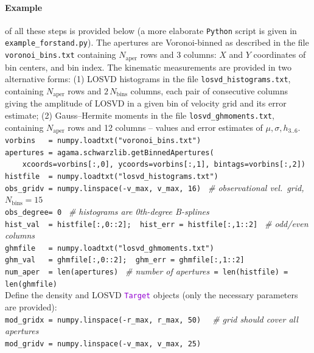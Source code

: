 \documentclass[12pt]{article}
\newcommand{\Python}{\texttt{Python}\xspace}
\newcommand{\ttt}[1]{\textcolor{darkviolet}{\texttt{#1}}}
\let\oldparagraph\paragraph
\renewcommand{\paragraph}[1]{\vspace{-2mm}\oldparagraph{#1}}
\begin{document}
\paragraph{Example} \label{sec:SchwarzschildExample} of all these steps is provided below (a more elaborate \Python script is given in \texttt{example_forstand.py}). The apertures are Voronoi-binned as described in the file \texttt{voronoi_bins.txt} containing $N_\mathrm{aper}$ rows and 3 columns: $X$ and $Y$ coordinates of bin centers, and bin index. The kinematic measurements are provided in two alternative forms: (1) LOSVD histograms in the file \texttt{losvd_histograms.txt}, containing $N_\mathrm{aper}$ rows and $2\,N_\mathrm{bins}$ columns, each pair of consecutive columns giving the amplitude of LOSVD in a given bin of velocity grid and its error estimate; (2) Gauss--Hermite moments in the file \texttt{losvd_ghmoments.txt}, containing $N_\mathrm{aper}$ rows and 12 columns -- values and error estimates of $\mu, \sigma, h_{3..6}$.\\[2mm]
\texttt{vorbins~~~= numpy.loadtxt("voronoi_bins.txt")\\
apertures~= agama.schwarzlib.getBinnedApertures(\\
\mbox{}~~~~xcoords=vorbins[:,0], ycoords=vorbins[:,1], bintags=vorbins[:,2])\\
histfile~~= numpy.loadtxt("losvd_histograms.txt")\\
obs_gridv~= numpy.linspace(-v_max, v_max, 16)}
\textit{\color{Sepia} \ \# observational vel.~grid, $N_\mathrm{bins}=15$}\\
\texttt{obs_degree= 0}
\textit{\color{Sepia} \ \# histograms are 0th-degree B-splines}\\
\texttt{hist_val~~= histfile[:,0::2];~~hist_err = histfile[:,1::2]}
\textit{\color{Sepia} \ \# odd/even columns}\\
\texttt{ghmfile~~~= numpy.loadtxt("losvd_ghmoments.txt")\\
ghm_val~~~= ghmfile[:,0::2];~~ghm_err = ghmfile[:,1::2]\\
num_aper~~= len(apertures)} 
{\color{Sepia}\textit{\ \# number of apertures}\texttt{ = len(histfile) = len(ghmfile)}}\\[2mm]
Define the density and LOSVD \ttt{Target} objects (only the necessary parameters are provided):\\[2mm]
\texttt{mod_gridx~= numpy.linspace(-r_max, r_max, 50)}
\textit{\color{Sepia} \ \ \# grid should cover all apertures}\\
\texttt{mod_gridv~= numpy.linspace(-v_max, v_max, 25)}
\end{document}
